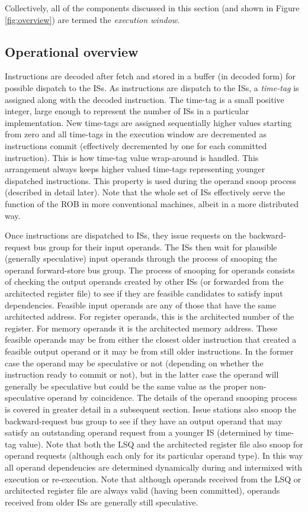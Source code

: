 \documentclass[10pt,dvips]{article}
\begin{document}
Collectively, all of the components discussed in this section
(and shown in 
Figure \ref{fig:overview}) are termed the \textit{execution window}.
%
%
\subsection{Operational overview}
%
Instructions are decoded after fetch and stored in a buffer (in decoded
form) for possible dispatch to the ISs.
As instructions are dispatch to the ISs, a \textit{time-tag}
is assigned along with the decoded instruction.  
The time-tag is a small positive integer, large enough to represent
the number of ISs in a particular implementation.
New time-tags are assigned sequentially higher values starting from
zero and all time-tags in the execution window are decremented
as instructions commit (effectively decremented by one for each
committed instruction).  This is how time-tag value wrap-around is handled.
This arrangement always keeps higher valued time-tags representing
younger dispatched instructions.  This property is used during the
operand snoop process (described in detail later).
Note that the whole set of ISs effectively
serve the function of the ROB in more conventional machines, albeit
in a more distributed way.

Once instructions are dispatched to ISs,
they issue requests on the backward-request bus group for their input operands.
The ISs then
wait for plausible (generally speculative) input operands
through the process of snooping the operand forward-store bus group.
The process of snooping for operands consists of checking the 
output operands created by other ISs (or forwarded from the
architected register file) to see if they are feasible candidates
to satisfy input dependencies.
Feasible input operands are any of those that have the same architected address.
For register operands, this is the architected number of the register.  
For memory operands it is the architected memory address.
These feasible operands may be from either the
closest older instruction that created a feasible output operand 
or it may be
from still older instructions.  
In the former case the operand
may be speculative or not (depending on whether the instruction
ready to commit or not),
but in the latter case the operand
will generally be speculative but could be the same value as
the proper non-speculative operand by coincidence.
The details of the operand snooping process is
covered in greater detail in a subsequent section.
Issue stations also snoop the backward-request bus group to
see if they have an output operand that may satisfy an outstanding
operand request from a younger IS (determined by time-tag
value).
Note that both the LSQ and the architected register file also
snoop for operand requests (although each only for its particular
operand type).
In this way all operand dependencies are determined dynamically 
during and intermixed with execution or re-execution.
Note that although operands received from the LSQ or architected
register file are always valid (having been committed), 
operands received from older
ISs are generally still speculative.
\end{document}
